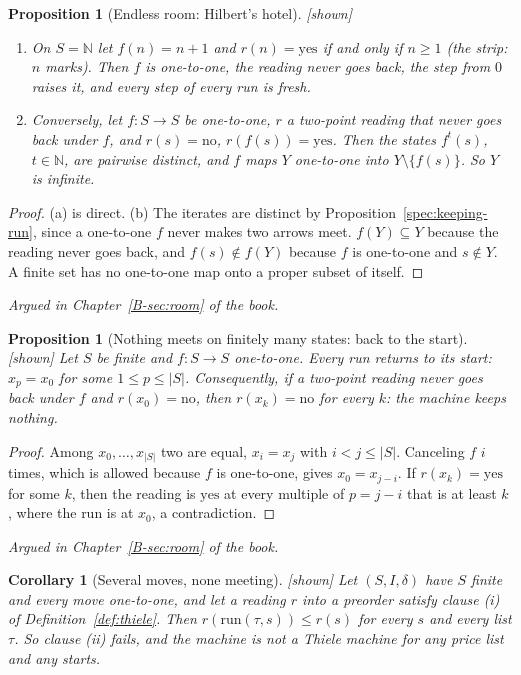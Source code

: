 \documentclass[11pt, a4paper]{article}
\theoremstyle{plain}
\newtheorem{proposition}[theorem]{Proposition}
\newtheorem{corollary}[theorem]{Corollary}
\theoremstyle{definition}
\theoremstyle{remark}
\newcommand{\N}{\mathbb{N}}
\newcommand{\step}{\delta}
\newcommand{\rd}{r}
\newcommand{\run}{\mathrm{run}}
\newcommand{\argued}[1]{\par\noindent\textit{Argued in Chapter~\ref{B-#1} of the book.}\par}
\newcommand{\kind}[1]{\textup{[#1]}}
\begin{document}
\begin{proposition}[Endless room: Hilbert's hotel]\label{spec:hotel} \kind{shown}
\begin{enumerate}[label=(\alph*)]
\item On $S=\N$ let $f(n)=n+1$ and $\rd(n)=\mathrm{yes}$ if and only if $n\ge1$ (the strip: $n$ marks).
Then $f$ is one-to-one, the reading never goes back, the step from $0$ raises it, and every step of
every run is fresh.
\item Conversely, let $f:S\to S$ be one-to-one, $\rd$ a two-point reading that never goes back under
$f$, and $\rd(s)=\mathrm{no}$, $\rd(f(s))=\mathrm{yes}$. Then the states $f^t(s)$, $t\in\N$, are pairwise
distinct, and $f$ maps $Y$ one-to-one into $Y\setminus\{f(s)\}$. So $Y$ is infinite.
\end{enumerate}
\end{proposition}

\begin{proof}
(a) is direct. (b) The iterates are distinct by Proposition~\ref{spec:keeping-run}, since a one-to-one
$f$ never makes two arrows meet. $f(Y)\subseteq Y$ because the reading never goes back, and
$f(s)\notin f(Y)$ because $f$ is one-to-one and $s\notin Y$. A finite set has no one-to-one map onto a
proper subset of itself.
\end{proof}

\argued{sec:room}

\begin{proposition}[Nothing meets on finitely many states: back to the start]\label{spec:zermelo}
\kind{shown}
Let $S$ be finite and $f:S\to S$ one-to-one. Every run returns to its start: $x_p=x_0$ for some
$1\le p\le|S|$. Consequently, if a two-point reading never goes back under $f$ and
$\rd(x_0)=\mathrm{no}$, then $\rd(x_k)=\mathrm{no}$ for every $k$: the machine keeps nothing.
\end{proposition}

\begin{proof}
Among $x_0,\dots,x_{|S|}$ two are equal, $x_i=x_j$ with $i<j\le|S|$. Canceling $f$ $i$ times, which is
allowed because $f$ is one-to-one, gives $x_0=x_{j-i}$. If $\rd(x_k)=\mathrm{yes}$ for some $k$, then the
reading is $\mathrm{yes}$ at every multiple of $p=j-i$ that is at least $k$, where the run is at $x_0$, a
contradiction.
\end{proof}

\argued{sec:room}

\begin{corollary}[Several moves, none meeting]\label{spec:all-perm} \kind{shown}
Let $(S,I,\step)$ have $S$ finite and every move one-to-one, and let a reading $\rd$ into a preorder
satisfy clause (i) of Definition~\ref{def:thiele}. Then $\rd(\run(\tau,s))\le\rd(s)$ for every $s$ and
every list $\tau$. So clause (ii) fails, and the machine is not a Thiele machine for any price list and
any starts.
\end{corollary}
\end{document}

